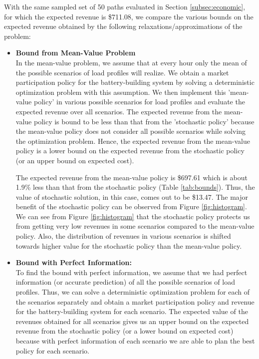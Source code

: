\documentclass[11pt,twoside]{article}
\begin{document}
With the same sampled set of 50 paths evaluated in Section \ref{subsec:economic}, for which the expected revenue is \$711.08, we compare the various bounds on the expected revenue obtained by the following relaxations/approximations of the problem: 
\begin{itemize}
\item \textbf{Bound from Mean-Value Problem}\\
In the mean-value problem, we assume that at every hour only the mean of the possible scenarios of load profiles will realize. We obtain a market participation policy for the battery-building system by solving a deterministic optimization problem with this assumption. We then implement this 'mean-value policy' in various possible scenarios for load profiles and evaluate the expected revenue over all scenarios. The expected revenue from the mean-value policy is bound to be less than that from the 'stochastic policy' because the mean-value policy does not consider all possible scenarios while solving the optimization problem. Hence, the expected revenue from the mean-value policy is a lower bound on the expected revenue from the stochastic policy (or an upper bound on expected cost). 

The expected revenue from the mean-value policy is \$697.61 which is about 1.9\% less than that from the stochastic policy (Table \ref{tab:bounds}). Thus, the value of stochastic solution, in this case, comes out to be \$13.47. The major benefit of the stochastic policy can be observed from Figure \ref{fig:histogram}. We can see from Figure \ref{fig:histogram} that the stochastic policy protects us from getting very low revenues in some scenarios compared to the mean-value policy. Also, the distribution of revenues in various scenarios is shifted towards higher value for the stochastic policy than the mean-value policy.

\item \textbf{Bound with Perfect Information:}\\
To find the bound with perfect information, we assume that we had perfect information (or accurate prediction) of all the possible scenarios of load profiles. Thus, we can solve a deterministic optimization problem for each of the scenarios separately and obtain a market participation policy and revenue for the battery-building system for each scenario. The expected value of the revenues obtained for all scenarios gives us an upper bound on the expected revenue from the stochastic policy (or a lower bound on expected cost) because with perfect information of each scenario we are able to plan the best policy for each scenario.


\end{itemize}
\end{document}
